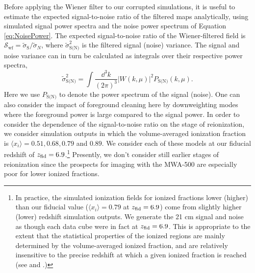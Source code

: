 Before applying the Wiener filter to our corrupted simulations, it is
useful to estimate the expected signal-to-noise ratio of the filtered maps 
analytically, using
simulated signal power spectra and the noise power
spectrum of Equation \ref{eq:NoisePower}. The expected signal-to-noise ratio of
the Wiener-filtered field is $\mathcal{S}_{\text{wf}} =
\tilde{\sigma}_{\text{S}}/\tilde{\sigma}_{N}$, where
$\tilde{\sigma}^{2}_{\text{S(N)}}$ is the filtered signal (noise)
variance. The signal and noise variance can in turn be calculated as
integrals over their respective power spectra,
\begin{equation}
\tilde{\sigma}^2_{\text{S(N)}} = \int \frac{\dd^3
  k}{(2\pi)^3}|W(k,\mu)|^{2}P_{\text{S(N)}}(k,\mu). \label{eq:snr}
\end{equation}
Here we use $P_{\text{S(N)}}$ to denote the power spectrum of the
signal (noise). One can also consider the impact of foreground
cleaning here by downweighting modes where the foreground power
is large compared to the signal power.
In order to consider the dependence of the signal-to-noise ratio
on the stage of reionization, we consider simulation outputs
in which the volume-averaged ionization fraction is 
$\langle x_i \rangle = 0.51, 0.68, 0.79$ and $0.89$. We consider each of these
models at our fiducial redshift of $z_{\rm fid} = 6.9$.\footnote{In practice,
the simulated ionization fields for ionized fractions lower (higher) than our fiducial value ($\langle x_i \rangle = 0.79$ at $z_{\rm fid} = 6.9$) 
come from slightly higher
(lower) redshift simulation outputs. We generate the 21 cm signal and noise as though each data cube were in
fact at $z_{\rm fid} = 6.9$. This is appropriate to the extent that
the statistical properties of the ionized regions are mainly determined by
the volume-averaged ionized fraction, and are relatively insensitive to the precise
redshift at which a given ionized fraction is reached (see \citealt{McQuinn:2006et}
and \citealt{Furlanetto:2004nh}.)} Presently, we don't consider still earlier stages
of reionization since the prospects for imaging with the MWA-500 are especially poor for lower
ionized fractions.

